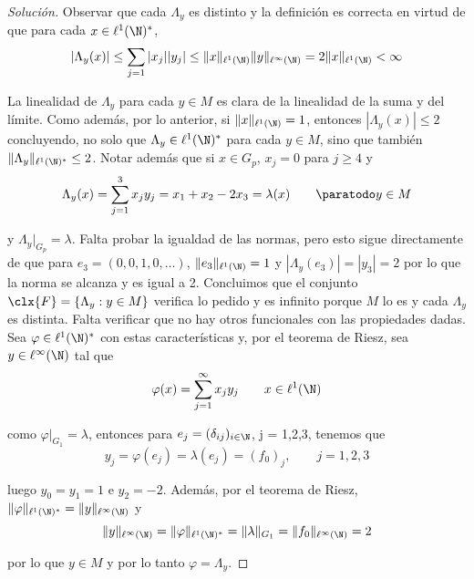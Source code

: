 \documentclass[duedate = 11 de Septiembre, 
			ramo = An\'alisis Funcional, 
			doctype = Tarea 1,
			semester = 2,
			year = 2017]{tarea}
\begin{document}
\begin{enumerate}[(i)]
\begin{proof}[Solución]
	Observar que cada $\Lambda_{y}$ es distinto y la definición es correcta en virtud de que para cada $x \in \ell^{1}(\N)^{*}$,
		\[ |\Lambda_{y}(x)| \leq \sum_{j=1} |x_{j}||y_{j}| \leq \|x\|_{\ell^{1}(\N)} \|y\|_{\ell^{\infty}(\N)} = 2\|x\|_{\ell^{1}(\N)} < \infty	 \]
	
	La linealidad de $\Lambda_{y}$ para cada $y \in M$ es clara de la linealidad de la suma y del límite. Como además, por lo anterior, si $\|x\|_{\ell^{1}(\N)} = 1$, entonces $|\Lambda_{y}(x)| \leq 2$ concluyendo, no solo que $\Lambda_{y} \in \ell^{1}(\N)^{*}$ para cada $y \in M$, sino que también $\|\Lambda_{y}\|_{\ell^{1}(\N)^{*}} \leq 2$.  Notar además que si $x \in G_{p}$, $x_{j} = 0$ para $j \geq 4$ y
		$$\Lambda_{y}(x) = \sum_{j=1}^{3} x_{j}y_{j} = x_{1} + x_{2} - 2x_{3} = \lambda(x) \qquad \paratodo y \in M$$
	
	y $\Lambda_{y}\big|_{G_{p}} = \lambda$. Falta probar la igualdad de las normas, pero esto sigue directamente de que para $e_{3} = (0,0,1,0,\ldots)$, $\|e_{3}\|_{\ell^{1}(\N)} = 1$ y $|\Lambda_{y}(e_{3})| = |y_{3}| = 2$ por lo que la norma se alcanza y es igual a 2. Concluimos que el conjunto $\clx{F} = \{\Lambda_{y} : y \in M\}$ verifica lo pedido y es infinito porque $M$ lo es y cada $\Lambda_{y}$ es distinta. Falta verificar que no hay otros funcionales con las propiedades dadas. Sea $\varphi \in \ell^{1}(\N)^{*}$ con estas características y, por el teorema de Riesz, sea $y \in \ell^{\infty}(\N)$ tal que
		$$\varphi(x) = \sum_{j=1}^{\infty} x_{j}y_{j} \qquad x \in \ell^{1}(\N)$$
	
	como $\varphi\big|_{G_{1}} = \lambda$, entonces para $e_{j} = (\delta_{ij})_{i \in \N}$, j = 1,2,3, tenemos que
		$$y_{j} = \varphi(e_{j}) = \lambda(e_{j}) = (f_{0})_{j}, \qquad j = 1,2,3$$
	
	luego $y_{0} = y_{1} = 1$ e $y_{2} = -2$. Además, por el teorema de Riesz, $\|\varphi\|_{\ell^{1}(\N)^{*}} = \|y\|_{\ell^{\infty}(\N)}$ y
		\[ \|y\|_{\ell^{\infty}(\N)}
				=	\|\varphi\|_{\ell^{1}(\N)^{*}}
				=	\|\lambda\|_{G_{1}}
				=	\|f_{0}\|_{\ell^{\infty}(\N)}
				=	2 \]
	
	por lo que $y \in M$ y por lo tanto $\varphi = \Lambda_{y}$.
	\end{proof}
\end{enumerate}
\end{document}
